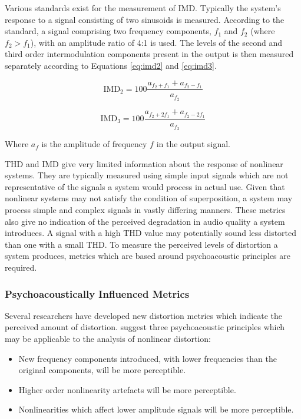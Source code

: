 			Various standards exist for the measurement of IMD. Typically the system's response to a signal
			consisting of two sinusoids is measured. According to the \citet{IEC2001amplifiers} standard, a
			signal comprising two frequency components, $f_{1}$ and $f_{2}$ (where $f_{2} > f_{1}$), with an
			amplitude ratio of 4:1 is used.  The levels of the second and third order intermodulation
			components present in the output is then measured separately according to Equations \ref{eq:imd2}
			and \ref{eq:imd3}.

			\begin{equation}
				\mathrm{IMD}_{2} = 100\frac{a_{f_{2} + f_{1}} + a_{f_{2} - f_{1}}}{a_{f_{2}}}
				\label{eq:imd2}
			\end{equation}

			\begin{equation}
				\mathrm{IMD}_{3} = 100\frac{a_{f_{2} + 2f_{1}} + a_{f_{2} - 2f_{1}}}{a_{f_{2}}}
				\label{eq:imd3}
			\end{equation}

			Where $a_{f}$ is the amplitude of frequency $f$ in the output signal.

			THD and IMD give very limited information about the response of nonlinear systems. They are
			typically measured using simple input signals which are not representative of the signals a system
			would process in actual use. Given that nonlinear systems may not satisfy the condition of
			superposition, a system may process simple and complex signals in vastly differing manners. These
			metrics also give no indication of the perceived degradation in audio quality a system introduces.
			A signal with a high THD value may potentially sound less distorted than one with a small THD. To
			measure the perceived levels of distortion a system produces, metrics which are based around
			psychoacoustic principles are required.

		\subsubsection*{Psychoacoustically Influenced Metrics}
			Several researchers have developed new distortion metrics which indicate the perceived amount of
			distortion. \citet{geddes2003auditory} suggest three psychoacoustic principles which may be
			applicable to the analysis of nonlinear distortion:

			\begin{itemize}
				\item New frequency components introduced, with lower frequencies than the original
					components, will be more perceptible.
				\item Higher order nonlinearity artefacts will be more perceptible.
				\item Nonlinearities which affect lower amplitude signals will be more perceptible.
			\end{itemize}

